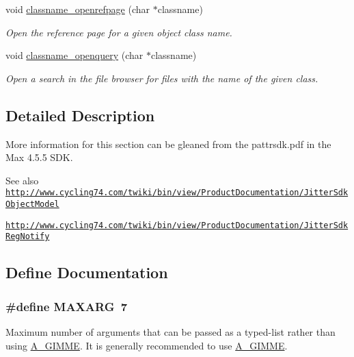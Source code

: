 \begin{DoxyCompactItemize}
void \hyperlink{group__obj_ga8e08b5bc9657c1800ee8a452e9d14d3d}{classname\_\-openrefpage} (char $\ast$classname)
\begin{DoxyCompactList}\small\item\em Open the reference page for a given object class name. \item\end{DoxyCompactList}\item 
void \hyperlink{group__obj_ga24a3ab7c91801d4b0ae377d15adfc117}{classname\_\-openquery} (char $\ast$classname)
\begin{DoxyCompactList}\small\item\em Open a search in the file browser for files with the name of the given class. \item\end{DoxyCompactList}\end{DoxyCompactItemize}


\subsection{Detailed Description}
More information for this section can be gleaned from the pattrsdk.pdf in the Max 4.5.5 SDK. \begin{DoxySeeAlso}{See also}
\href{http://www.cycling74.com/twiki/bin/view/ProductDocumentation/JitterSdkObjectModel}{\tt http://www.cycling74.com/twiki/bin/view/ProductDocumentation/JitterSdkObjectModel} 

\href{http://www.cycling74.com/twiki/bin/view/ProductDocumentation/JitterSdkRegNotify}{\tt http://www.cycling74.com/twiki/bin/view/ProductDocumentation/JitterSdkRegNotify} 
\end{DoxySeeAlso}


\subsection{Define Documentation}
\hypertarget{group__obj_ga4c171d1ccc50f0b6ce7ad2f475eeba32}{
\subsubsection[{MAXARG}]{\setlength{\rightskip}{0pt plus 5cm}\#define MAXARG~7}}
\label{group__obj_ga4c171d1ccc50f0b6ce7ad2f475eeba32}


Maximum number of arguments that can be passed as a typed-\/list rather than using \hyperlink{group__atom_gga8aa6700e9f00b132eb376db6e39ade47a81c1a8550f038db16a619167a70a79b6}{A\_\-GIMME}. It is generally recommended to use \hyperlink{group__atom_gga8aa6700e9f00b132eb376db6e39ade47a81c1a8550f038db16a619167a70a79b6}{A\_\-GIMME}. 

